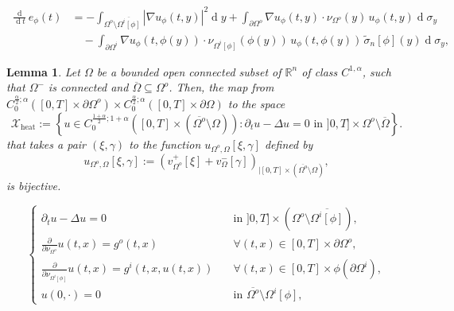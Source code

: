 \documentclass[10pt,a4paper]{amsart}
\newtheorem{lemma}{Lemma}
\renewcommand{\d}[1]{\ensuremath{\operatorname{d}\!{#1}}}
\begin{document}
    \begin{equation}
    \begin{aligned}
        \frac{\d{}}{\d t}e_\phi(t) &= - \int_{\Omega^o \setminus \overline{\Omega^i[\phi]}} |\nabla u_\phi(t,y)|^2 \d y + \int_{\partial\Omega^o} 
        \nabla u_\phi(t,y)\cdot \nu_{\Omega^o}(y) \, u_{\phi}(t,y) \d \sigma_y 
        \\
        & \quad
        - \int_{\partial\Omega^i} \nabla u_\phi(t,\phi(y))\cdot \nu_{\Omega^i[\phi]}(\phi(y)) \, u_\phi(t,\phi(y)) \, \tilde\sigma_n[\phi](y) \d\sigma_y,
    \end{aligned}
    \end{equation}

\begin{lemma}\label{lemma rappr}
    Let $\Omega$ be a bounded open connected subset of $\mathbb{R}^n$ of class $C^{1,\alpha}$, such that $\Omega^-$ is connected and $\overline{\Omega}\subseteq\Omega^o$. Then, the map from $C_0^{\frac{\alpha}{2}; \alpha}([0,T] \times \partial\Omega^o) \times C_0^{\frac{\alpha}{2}; \alpha}([0,T] \times \partial \Omega)$ to the space 
    \begin{equation*}
    \mathcal{X}_{\mathrm{heat}} := \left\{u\in C_{0}^{\frac{1+\alpha}{2}; 1+\alpha}([0,T] \times (\overline{\Omega^o} \setminus \Omega)) \colon \partial_t u  - \Delta u =0 \text{ in } ]0,T] \times \Omega^o \setminus \overline{\Omega} \right\}.
    \end{equation*}
    that takes a pair $(\xi,\gamma)$ to the function $u_{\Omega^o,\Omega}[\xi,\gamma]$ defined by
    \begin{equation}\label{eq: representation single layer}
    u_{\Omega^o,\Omega}[\xi,\gamma] := \left(v^+_{\Omega^o} [\xi] + v^-_{\Omega}[\gamma] \right)_{| [0,T] \times (\overline{\Omega^o} \setminus \Omega)},
    \end{equation}
    is bijective.
\end{lemma}

\begin{equation}\label{princeqpertu 2}
\begin{cases}
    \partial_t u - \Delta u = 0 & \quad\text{in } ]0,T] \times (\Omega^o \setminus \overline{\Omega^i[\phi]}), 
    \\
    \frac{\partial}{\partial\nu_{\Omega^o}} u(t,x) = g^o(t,x)& \quad \forall (t,x)\in [0,T] \times \partial \Omega^o, 
    \\
    \frac{\partial}{\partial\nu_{\Omega^i[\phi]}} u (t,x) = g^i(t,x,u(t,x)) & \quad \forall (t,x)\in  [0,T] \times \phi(\partial\Omega^i),
    \\
    u(0,\cdot)=0 & \quad \text{in } \overline{\Omega^o} \setminus \Omega^i[\phi],
\end{cases}
\end{equation}
\end{document}
